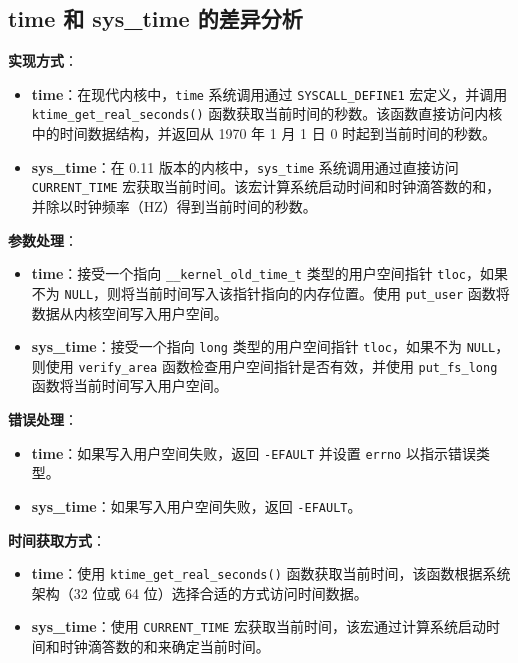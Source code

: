 \documentclass[12pt,hyperref,a4paper,UTF8]{ctexart}
\begin{document}
\subsection{time 和 sys\_time 的差异分析}

\textbf{实现方式}：

\begin{itemize}
    \item \textbf{time}：在现代内核中，\lstinline|time| 系统调用通过 \lstinline|SYSCALL_DEFINE1| 宏定义，并调用 \lstinline|ktime_get_real_seconds()| 函数获取当前时间的秒数。该函数直接访问内核中的时间数据结构，并返回从 1970 年 1 月 1 日 0 时起到当前时间的秒数。
    \item \textbf{sys\_time}：在 0.11 版本的内核中，\lstinline|sys_time| 系统调用通过直接访问 \lstinline|CURRENT_TIME| 宏获取当前时间。该宏计算系统启动时间和时钟滴答数的和，并除以时钟频率（HZ）得到当前时间的秒数。
\end{itemize}

\textbf{参数处理}：

\begin{itemize}
    \item \textbf{time}：接受一个指向 \lstinline|__kernel_old_time_t| 类型的用户空间指针 \lstinline|tloc|，如果不为 \lstinline|NULL|，则将当前时间写入该指针指向的内存位置。使用 \lstinline|put_user| 函数将数据从内核空间写入用户空间。
    \item \textbf{sys\_time}：接受一个指向 \lstinline|long| 类型的用户空间指针 \lstinline|tloc|，如果不为 \lstinline|NULL|，则使用 \lstinline|verify_area| 函数检查用户空间指针是否有效，并使用 \lstinline|put_fs_long| 函数将当前时间写入用户空间。
\end{itemize}

\textbf{错误处理}：

\begin{itemize}
    \item \textbf{time}：如果写入用户空间失败，返回 \lstinline|-EFAULT| 并设置 \lstinline|errno| 以指示错误类型。
    \item \textbf{sys\_time}：如果写入用户空间失败，返回 \lstinline|-EFAULT|。
\end{itemize}

\textbf{时间获取方式}：

\begin{itemize}
    \item \textbf{time}：使用 \lstinline|ktime_get_real_seconds()| 函数获取当前时间，该函数根据系统架构（32 位或 64 位）选择合适的方式访问时间数据。
    \item \textbf{sys\_time}：使用 \lstinline|CURRENT_TIME| 宏获取当前时间，该宏通过计算系统启动时间和时钟滴答数的和来确定当前时间。
\end{itemize}
\end{document}
